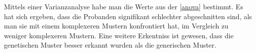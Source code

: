 Mittels einer Varianzanalyse habe man die Werte aus der \autoref{anova} bestimmt. 
Es hat sich ergeben, dass die Probanden signifikant schlechter abgeschnitten sind, als man sie mit einem komplexeren Mustern konfrontiert hat, im Vergleich zu weniger komplexeren Mustern. 
Eine weitere Erkentniss ist gewesen, dass die genetischen Muster besser erkannt wurden als die generischen Muster.














